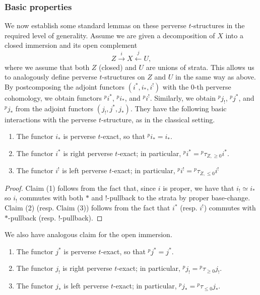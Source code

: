 \documentclass[letterpaper,11pt]{amsart}
\begin{document}
\subsubsection{Basic properties} We now establish some standard lemmas on these perverse $t$-structures in the required level of generality. Assume we are given a decomposition of $X$ into a closed immersion and its open complement 
\[Z\xrightarrow{i} X \xleftarrow{j} U,\] 
where we assume that both $Z$ (closed) and $U$ are unions of strata. This allows us to analogously define perverse $t$-structures on $Z$ and $U$ in the same way as above. By postcomposing the adjoint functors $(i^{*},i_{*},i^{!})$ with the 0-th perverse cohomology, we obtain functors $\phantom{}^{p}i^{*}$, $\phantom{}^{p}i_\ast$, and $\phantom{}^{p}i^{!}$. Similarly, we obtain $\phantom{}^{p}j_{!}$, $\phantom{}^{p}j^\ast$, and $\phantom{}^{p}j_\ast$ from the adjoint functors $(j_!,j^\ast,j_\ast)$. They have the following basic interactions with the perverse $t$-structure, as in the classical setting. 
\begin{lemma}{\label{lemma: tstructureLemmasClosedImmersions}}
\begin{enumerate}
\item The functor $i_\ast$ is perverse $t$-exact, so that $\phantom{}^{p}i_\ast = i_\ast$. 
\item The functor $i^\ast$ is right perverse $t$-exact; in particular, $\phantom{}^{p}i^\ast =  \phantom{}^{p}\tau_{Z,\geq 0}i^\ast$.
\item The functor $i^{!}$ is left perverse $t$-exact; in particular, $\phantom{}^{p}i^{!} = \phantom{}^{p}\tau_{Z, \leq 0}i^{!}$
\end{enumerate}
\end{lemma}
\begin{proof}
Claim (1) follows from the fact that, since $i$ is proper, we have that $i_{!} \simeq i_{*}$ so $i_{!}$ commutes with both $*$ and $!$-pullback to the strata by proper base-change. Claim (2) (resp. Claim (3)) follows from the fact that $i^{*}$ (resp. $i^{!}$) commutes with $*$-pullback (resp. $!$-pullback).
\end{proof}
We also have analogous claim for the open immersion.
\begin{lemma}{\label{lemma: tstructureLemmasOpenImmersions}}
\begin{enumerate}
\item The functor $j^\ast$ is perverse $t$-exact, so that $\phantom{}^{p}j^\ast = j^\ast$. 
\item The functor $j_{!}$ is right perverse $t$-exact; in particular, $\phantom{}^{p}j_{!} =  \phantom{}^{p}\tau_{\geq 0}j_{!}$.
\item The functor $j_\ast$ is left perverse $t$-exact; in particular, $\phantom{}^{p}j_\ast = \phantom{}^{p}\tau_{\leq 0}j_\ast$.
\end{enumerate}
\end{lemma}
\end{document}
